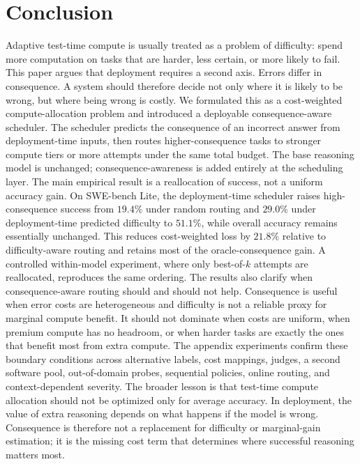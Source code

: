 \documentclass{article}
\begin{document}
\section{Conclusion}

Adaptive test-time compute is usually treated as a problem of
difficulty: spend more computation on tasks that are harder, less
certain, or more likely to fail. This paper argues that deployment
requires a second axis. Errors differ in consequence. A system should
therefore decide not only where it is likely to be wrong, but where
being wrong is costly.
We formulated this as a cost-weighted compute-allocation problem and
introduced a deployable consequence-aware scheduler. The scheduler
predicts the consequence of an incorrect answer from deployment-time
inputs, then routes higher-consequence tasks to stronger compute tiers
or more attempts under the same total budget. The base reasoning model
is unchanged; consequence-awareness is added entirely at the scheduling
layer.
The main empirical result is a reallocation of success, not a uniform
accuracy gain. On SWE-bench Lite, the deployment-time scheduler raises
high-consequence success from $19.4\%$ under random routing and
$29.0\%$ under deployment-time predicted difficulty to $51.1\%$,
while overall accuracy remains essentially unchanged. This reduces
cost-weighted loss by $21.8\%$ relative to difficulty-aware routing
and retains most of the oracle-consequence gain. A controlled
within-model experiment, where only best-of-$k$ attempts are
reallocated, reproduces the same ordering.
The results also clarify when consequence-aware routing should and
should not help. Consequence is useful when error costs are
heterogeneous and difficulty is not a reliable proxy for marginal
compute benefit. It should not dominate when costs are uniform, when
premium compute has no headroom, or when harder tasks are exactly the
ones that benefit most from extra compute. The appendix experiments
confirm these boundary conditions across alternative labels, cost
mappings, judges, a second software pool, out-of-domain probes,
sequential policies, online routing, and context-dependent severity.
The broader lesson is that test-time compute allocation should not be
optimized only for average accuracy. In deployment, the value of extra
reasoning depends on what happens if the model is wrong. Consequence is
therefore not a replacement for difficulty or marginal-gain estimation;
it is the missing cost term that determines where successful reasoning
matters most.



\end{document}

